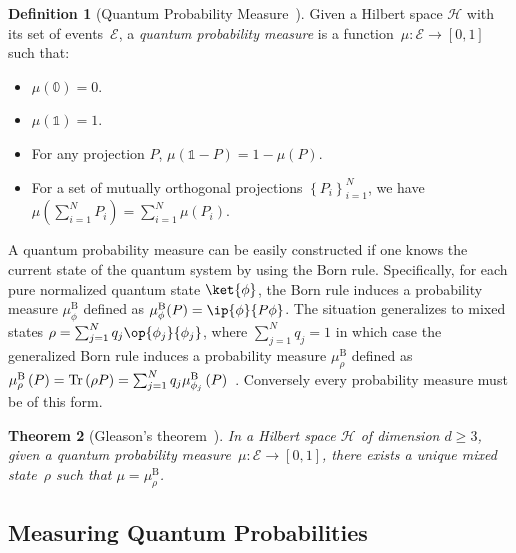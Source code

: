 \documentclass[12pt]{iopart}
\theoremstyle{plain}
\newtheorem{thm}{Theorem}
\theoremstyle{definition}
\newtheorem{definition}[thm]{Definition}
\theoremstyle{remark}
\newcommand{\Hilb}{\mathcal{H}}
\newcommand{\events}{\ensuremath{\mathcal{E}}}
\newcommand{\proj}[1]{\op{#1}{#1}}
\begin{document}
\begin{definition}[Quantum Probability Measure~\cite{10.2307/2308516,gleason1957,Redhead1987-REDINA,Maassen2010}]\label{def:QuantumProbabilitySpace}
Given a Hilbert space $\Hilb$ with its set of events~$\events$,
a \emph{quantum probability measure} is a function~$\mu:\events\rightarrow[0,1]$
such that: 
\begin{itemize}
\item $\mu(\mathbb{0})=0$. 
\item $\mu(\mathbb{1})=1$. 
\item For any projection $P$, $\mu\left(\mathbb{1}-P\right)=1-\mu\left(P\right)$.
\item For a set of mutually orthogonal projections $\left\{ P_{i}\right\} _{i=1}^{N}$,
we have $\mu\left(\sum_{i=1}^{N}P_{i}\right)=\sum_{i=1}^{N}\mu\left(P_{i}\right)$.
\end{itemize}
\end{definition}

\noindent A quantum probability measure can be easily constructed if
one knows the current state of the quantum system by using the Born
rule.  Specifically, for each
pure normalized quantum state $\ket{\phi}$, the Born rule induces a
probability measure $\mu_{\phi}^{\mathrm{B}}$ defined as
$\mu_{\phi}^{\mathrm{B}}(P)=\ip{\phi}{P\phi}$. The situation generalizes to
mixed states $\rho = \sum_{j=1}^{N}q_{j}\proj{\phi_{j}}$, where
$\sum_{j=1}^{N}q_{j}=1$ in which case the generalized Born rule
induces a probability measure $\mu_{\rho}^{\mathrm{B}}$ defined
as
$\mu_{\rho}^{\mathrm{B}}\left(P\right) = \mathop{\mathrm{Tr}}\nolimits\left(\rho P\right) =
\sum_{j=1}^{N}
q_{j}\mu_{\phi_{j}}^{\mathrm{B}}\left(P\right)$~\cite{peres1995quantum,544199,Jaeger2007}.
Conversely every probability measure must be of this form.

\begin{thm}[Gleason's
  theorem~\cite{gleason1957,Redhead1987-REDINA,peres1995quantum}]\label{cor:Gleason's}In
a Hilbert space $\Hilb$ of dimension $d\geq3$, given a quantum probability
measure~$\mu:\events\rightarrow[0,1]$, there exists a unique mixed
state~$\rho$ such that $\mu=\mu_{\rho}^{\mathrm{B}}$.
\end{thm}

\subsection{Measuring Quantum Probabilities}
\end{document}
